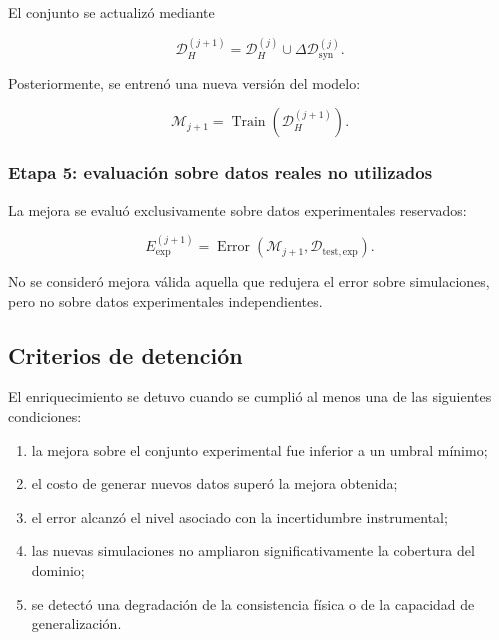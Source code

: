 El conjunto se actualizó mediante

\begin{equation}
\mathcal{D}_{H}^{(j+1)}
=
\mathcal{D}_{H}^{(j)}
\cup
\Delta\mathcal{D}_{\mathrm{syn}}^{(j)}.
\end{equation}

Posteriormente, se entrenó una nueva versión del modelo:

\begin{equation}
\mathcal{M}_{j+1}
=
\operatorname{Train}
\left(
\mathcal{D}_{H}^{(j+1)}
\right).
\end{equation}

\subsubsection*{Etapa 5: evaluación sobre datos reales no utilizados}

La mejora se evaluó exclusivamente sobre datos experimentales reservados:

\begin{equation}
E_{\mathrm{exp}}^{(j+1)}
=
\operatorname{Error}
\left(
\mathcal{M}_{j+1},
\mathcal{D}_{\mathrm{test,exp}}
\right).
\end{equation}

No se consideró mejora válida aquella que redujera el error sobre simulaciones, pero no sobre datos experimentales independientes.

\subsection{Criterios de detención}
\label{subsec:criterios_detencion_bucle}

El enriquecimiento se detuvo cuando se cumplió al menos una de las siguientes condiciones:

\begin{enumerate}
    \item la mejora sobre el conjunto experimental fue inferior a un umbral mínimo;
    \item el costo de generar nuevos datos superó la mejora obtenida;
    \item el error alcanzó el nivel asociado con la incertidumbre instrumental;
    \item las nuevas simulaciones no ampliaron significativamente la cobertura del dominio;
    \item se detectó una degradación de la consistencia física o de la capacidad de generalización.
\end{enumerate}

